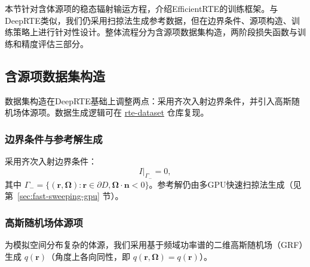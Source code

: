 本节针对含体源项的稳态辐射输运方程，介绍EfficientRTE的训练框架。与DeepRTE类似，我们仍采用扫掠法生成参考数据，但在边界条件、源项构造、训练策略上进行针对性设计。整体流程分为含源项数据集构造，两阶段损失函数与训练和精度评估三部分。

\subsection{含源项数据集构造}

数据集构造在DeepRTE基础上调整两点：采用齐次入射边界条件，并引入高斯随机场体源项。数据生成逻辑可在 \href{https://github.com/mazhengcn/rte-dataset}{rte-dataset} 仓库复现。

\subsubsection{边界条件与参考解生成}
采用齐次入射边界条件：
\begin{equation}
    I\big|_{\Gamma_-} = 0,
\end{equation}
其中 $\Gamma_- = \{(\boldsymbol{r},\boldsymbol{\Omega}):\boldsymbol{r}\in\partial D, \boldsymbol{\Omega}\cdot\boldsymbol{n}<0\}$。参考解仍由多GPU快速扫掠法生成（见第~\ref{sec:fast-sweeping-gpu} 节）。

\subsubsection{高斯随机场体源项}
为模拟空间分布复杂的体源，我们采用基于频域功率谱的二维高斯随机场（GRF）生成 $q(\boldsymbol{r})$（角度上各向同性，即 $q(\boldsymbol{r},\boldsymbol{\Omega})=q(\boldsymbol{r})$）。

